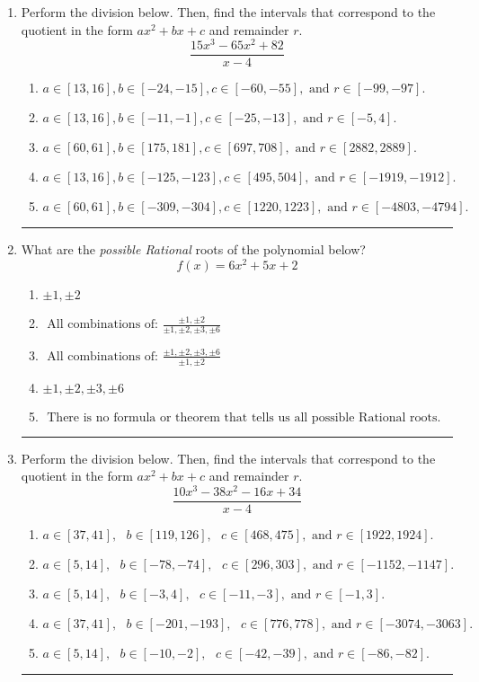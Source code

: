 \documentclass[14pt]{extbook}
\newcommand{\litem}[1]{\item#1\hspace*{-1cm}\rule{\textwidth}{0.4pt}}
\begin{document}
\begin{enumerate}
{\begin{enumerate}[label=\Alph*.]
\end{enumerate} }
\litem{
Perform the division below. Then, find the intervals that correspond to the quotient in the form $ax^2+bx+c$ and remainder $r$.\[ \frac{15x^{3} -65 x^{2} + 82}{x -4} \]\begin{enumerate}[label=\Alph*.]
\item \( a \in [13, 16], b \in [-24, -15], c \in [-60, -55], \text{ and } r \in [-99, -97]. \)
\item \( a \in [13, 16], b \in [-11, -1], c \in [-25, -13], \text{ and } r \in [-5, 4]. \)
\item \( a \in [60, 61], b \in [175, 181], c \in [697, 708], \text{ and } r \in [2882, 2889]. \)
\item \( a \in [13, 16], b \in [-125, -123], c \in [495, 504], \text{ and } r \in [-1919, -1912]. \)
\item \( a \in [60, 61], b \in [-309, -304], c \in [1220, 1223], \text{ and } r \in [-4803, -4794]. \)

\end{enumerate} }
\litem{
What are the \textit{possible Rational} roots of the polynomial below?\[ f(x) = 6x^{2} +5 x + 2 \]\begin{enumerate}[label=\Alph*.]
\item \( \pm 1,\pm 2 \)
\item \( \text{ All combinations of: }\frac{\pm 1,\pm 2}{\pm 1,\pm 2,\pm 3,\pm 6} \)
\item \( \text{ All combinations of: }\frac{\pm 1,\pm 2,\pm 3,\pm 6}{\pm 1,\pm 2} \)
\item \( \pm 1,\pm 2,\pm 3,\pm 6 \)
\item \( \text{ There is no formula or theorem that tells us all possible Rational roots.} \)

\end{enumerate} }
\litem{
Perform the division below. Then, find the intervals that correspond to the quotient in the form $ax^2+bx+c$ and remainder $r$.\[ \frac{10x^{3} -38 x^{2} -16 x + 34}{x -4} \]\begin{enumerate}[label=\Alph*.]
\item \( a \in [37, 41], \text{   } b \in [119, 126], \text{   } c \in [468, 475], \text{   and   } r \in [1922, 1924]. \)
\item \( a \in [5, 14], \text{   } b \in [-78, -74], \text{   } c \in [296, 303], \text{   and   } r \in [-1152, -1147]. \)
\item \( a \in [5, 14], \text{   } b \in [-3, 4], \text{   } c \in [-11, -3], \text{   and   } r \in [-1, 3]. \)
\item \( a \in [37, 41], \text{   } b \in [-201, -193], \text{   } c \in [776, 778], \text{   and   } r \in [-3074, -3063]. \)
\item \( a \in [5, 14], \text{   } b \in [-10, -2], \text{   } c \in [-42, -39], \text{   and   } r \in [-86, -82]. \)


\end{enumerate}}
\end{enumerate}
\end{document}
